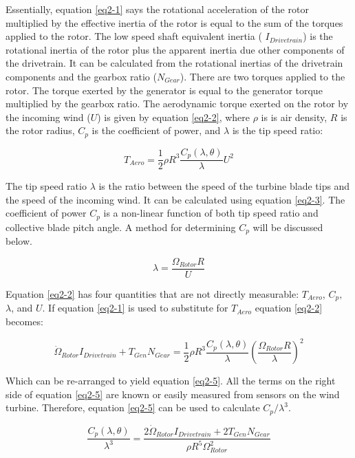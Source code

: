Essentially, equation  \ref{eq2-1} says the rotational acceleration of the rotor multiplied by the effective inertia of the rotor is equal to the sum of the torques applied to the rotor. The low speed shaft equivalent inertia ( $I_{Drivetrain}$) is the rotational inertia of the rotor plus the apparent inertia due other components of the drivetrain. It can be calculated from the rotational inertias of the drivetrain components and the gearbox ratio ($N_{Gear}$). There are two torques applied to the rotor. The torque exerted by the generator is equal to the generator torque multiplied by the gearbox ratio. The aerodynamic torque exerted on the rotor by the incoming wind ($U$) is given by equation \ref{eq2-2}, where $\rho$ is is air density, $R$ is the rotor radius, $C_p$ is the coefficient of power, and $\lambda$ is the tip speed ratio:

\begin{equation}
	T_{Aero}=\frac{1}{2}\rho R^{3}\frac{C_{p}(\lambda,\theta)}{\lambda}U^{2} \label{eq2-2}
\end{equation}

The tip speed ratio $\lambda$ is the ratio between the speed of the turbine blade tips and the speed of the incoming wind. It can be calculated using equation \ref{eq2-3}. The coefficient of power $C_p$ is a non-linear function of both tip speed ratio and collective blade pitch angle. A method for determining $C_p$ will be discussed below.

\begin{equation}
	\lambda=\frac{\Omega_{Rotor} R}{U} \label{eq2-3}
\end{equation}

Equation \ref{eq2-2} has four quantities that are not directly measurable: $T_{Aero}$, $C_p,$ $\lambda$, and $U$. If equation \ref{eq2-1} is used to substitute for $T_{Aero}$ equation \ref{eq2-2} becomes:

\begin{equation}
	\dot{\Omega }_{Rotor} I_{Drivetrain} + T_{Gen} N_{Gear} = \frac{1}{2} \rho R^3 \frac{C_p ( \lambda , \theta )}{\lambda} \left(\frac{\Omega_{Rotor} R}{\lambda}\right)^2   \label{eq2-4}
\end{equation}

Which can be re-arranged to yield equation \ref{eq2-5}. All the terms on the right side of equation \ref{eq2-5} are known or easily measured from sensors on the wind turbine. Therefore, equation \ref{eq2-5} can be used to calculate $C_p / \lambda^3$.

\begin{equation}
	 \frac{C_p ( \lambda, \theta)}{\lambda^3} = \frac{2 \dot{\Omega}_{Rotor} I_{Drivetrain} + 2 T_{Gen} N_{Gear}}{\rho R^5 \Omega^2_{Rotor}} \label{eq2-5}
\end{equation}


